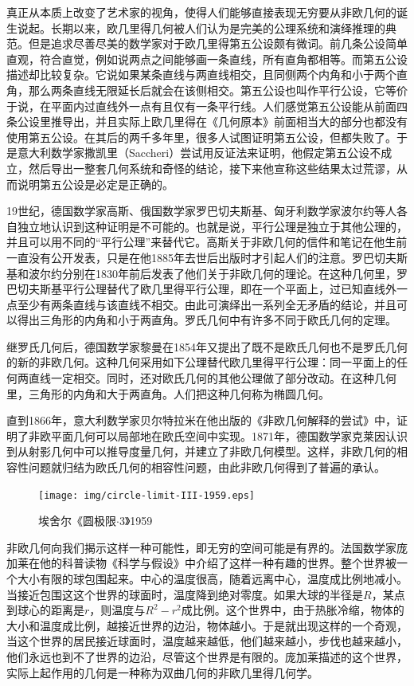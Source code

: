 \documentclass{article}
\begin{document}
真正从本质上改变了艺术家的视角，使得人们能够直接表现无穷要从非欧几何的诞生说起。长期以来，欧几里得几何被人们认为是完美的公理系统和演绎推理的典范。但是追求尽善尽美的数学家对于欧几里得第五公设颇有微词。前几条公设简单直观，符合直觉，例如说两点之间能够画一条直线，所有直角都相等。而第五公设描述却比较复杂。它说如果某条直线与两直线相交，且同侧两个内角和小于两个直角，那么两条直线无限延长后就会在该侧相交。第五公设也叫作平行公设，它等价于说，在平面内过直线外一点有且仅有一条平行线。人们感觉第五公设能从前面四条公设里推导出，并且实际上欧几里得在《几何原本》前面相当大的部分也都没有使用第五公设。在其后的两千多年里，很多人试图证明第五公设，但都失败了。于是意大利数学家撒凯里（Saccheri）尝试用反证法来证明，他假定第五公设不成立，然后导出一整套几何系统和奇怪的结论，接下来他宣称这些结果太过荒谬，从而说明第五公设是必定是正确的。

19世纪，德国数学家高斯、俄国数学家罗巴切夫斯基、匈牙利数学家波尔约等人各自独立地认识到这种证明是不可能的。也就是说，平行公理是独立于其他公理的，并且可以用不同的“平行公理”来替代它。高斯关于非欧几何的信件和笔记在他生前一直没有公开发表，只是在他1885年去世后出版时才引起人们的注意。罗巴切夫斯基和波尔约分别在1830年前后发表了他们关于非欧几何的理论。在这种几何里，罗巴切夫斯基平行公理替代了欧几里得平行公理，即在一个平面上，过已知直线外一点至少有两条直线与该直线不相交。由此可演绎出一系列全无矛盾的结论，并且可以得出三角形的内角和小于两直角。罗氏几何中有许多不同于欧氏几何的定理。

继罗氏几何后，德国数学家黎曼在1854年又提出了既不是欧氏几何也不是罗氏几何的新的非欧几何。这种几何采用如下公理替代欧几里得平行公理：同一平面上的任何两直线一定相交。同时，还对欧氏几何的其他公理做了部分改动。在这种几何里，三角形的内角和大于两直角。人们把这种几何称为椭圆几何。

直到1866年，意大利数学家贝尔特拉米在他出版的《非欧几何解释的尝试》中，证明了非欧平面几何可以局部地在欧氏空间中实现。1871年，德国数学家克莱因认识到从射影几何中可以推导度量几何，并建立了非欧几何模型。这样，非欧几何的相容性问题就归结为欧氏几何的相容性问题，由此非欧几何得到了普遍的承认。

\begin{figure}[htbp]
 \centering
 \texttt{[image: img/circle-limit-III-1959.eps]}
 \captionsetup{labelformat=empty}
 \caption{埃舍尔《圆极限$\cdot$3》1959}
 \label{fig:circle-limit-3}
\end{figure}

非欧几何向我们揭示这样一种可能性，即无穷的空间可能是有界的。法国数学家庞加莱在他的科普读物《科学与假设》中介绍了这样一种有趣的世界。整个世界被一个大小有限的球包围起来。中心的温度很高，随着远离中心，温度成比例地减小。当接近包围这这个世界的球面时，温度降到绝对零度。如果大球的半径是$R$，某点到球心的距离是$r$，则温度与$R^2 - r^2$成比例。这个世界中，由于热胀冷缩，物体的大小和温度成比例，越接近世界的边沿，物体越小。于是就出现这样的一个奇观，当这个世界的居民接近球面时，温度越来越低，他们越来越小，步伐也越来越小，他们永远也到不了世界的边沿，尽管这个世界是有限的。庞加莱描述的这个世界，实际上起作用的几何是一种称为双曲几何的非欧几里得几何学。
\end{document}
